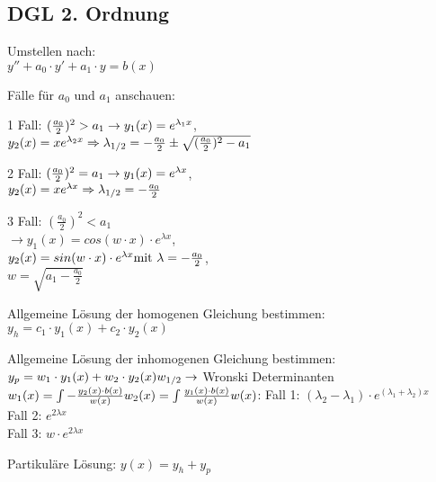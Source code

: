\documentclass[a4paper, 8pt, landscape]{extarticle}
\let\oldint\int
\renewcommand{\int}{\ensuremath{\textstyle\oldint}}
\begin{document}
\begin{multicols*}{5}
			\subsection{DGL 2. Ordnung}
				\begin{compactenum}	
					\item Umstellen nach:\\$y''+a_0\cdot y'+a_1\cdot y=b(x)$
					\item Fälle für $a_0$ und $a_1$ anschauen:
					\begin{compactenum}
						\item[1 Fall:] $(\frac{a_0}{2})^2>a_1\\
						\rightarrow y_1(x)=e^{\lambda_1x}$,\\ $y_2(x)=xe^{\lambda_2x}\\
						\Rightarrow \lambda_{1/2}=-\frac{a_0}{2}\pm\sqrt{(\frac{a_0}{2})^2-a_1}$
						\item[2 Fall:] $(\frac{a_0}{2})^2=a_1\\
						\rightarrow y_1(x)=e^{\lambda x}$,\\ $y_2(x)=xe^{\lambda x}\\
						\Rightarrow \lambda_{1/2}=-\frac{a_0}{2}$
						\item[3 Fall:] $(\frac{a_0}{2})^2<a_1$\\
						$\rightarrow y_1(x)=cos(w\cdot x)\cdot e^{\lambda x}$,\\
						$y_2(x)=sin(w\cdot x)\cdot e^{\lambda x}\\
						\text{mit } \lambda=-\frac{a_0}{2}$,\\ $w=\sqrt{a_1-\frac{a_0}{2}}$
					\end{compactenum}
					\item Allgemeine Lösung der homogenen Gleichung bestimmen:\\
					$y_h=c_1\cdot y_1(x)+c_2\cdot y_2(x)$
					\item Allgemeine Lösung der inhomogenen Gleichung bestimmen:\\
					$y_p=w_1\cdot y_1(x)+w_2\cdot y_2(x)\\
					w_{1/2} \rightarrow$ Wronski Determinanten\\
					$w_1(x)=\int-\frac{y_2(x)\cdot b(x)}{w(x)}\\
					w_2(x)=\int\frac{y_1(x)\cdot b(x)}{w(x)}\\
					w(x)$: Fall 1: $(\lambda_2-\lambda_1)\cdot e^{(\lambda_1+\lambda_2)x}$\\
					Fall 2: $e^{2\lambda x}$\\
					Fall 3: $w\cdot e^{2\lambda x}$
					\item Partikuläre Lösung: $y(x)=y_h+y_p$
				\end{compactenum}
\end{multicols*}
\end{document}
